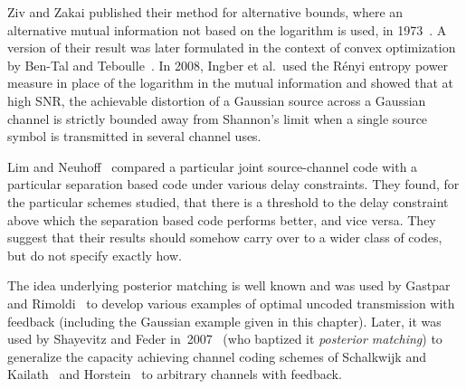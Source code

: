 Ziv and Zakai published their method for alternative bounds, where an
alternative mutual information not based on the logarithm is used, in
1973~\cite{ZivZ1973}. A version of their result was later formulated in the
context of convex optimization by Ben-Tal and Teboulle~\cite{BenTalT1988}. In
2008, Ingber et al.\ used the R\'enyi entropy power measure in place of the
logarithm in the mutual information and showed that at high SNR, the achievable
distortion of a Gaussian source across a Gaussian channel is strictly bounded
away from Shannon's limit when a single source symbol is transmitted in several
channel uses. 

Lim and Neuhoff~\cite{LimN2003} compared a particular joint source-channel code
with a particular separation based code under various delay constraints. They
found, for the particular schemes studied, that there is a threshold to the
delay constraint above which the separation based code performs better, and vice
versa. They suggest that their results should somehow carry over to a wider
class of codes, but do not specify exactly how. 

The idea underlying posterior matching is well known and was used by Gastpar and
Rimoldi~\cite{GastparR2003} to develop various examples of optimal uncoded
transmission with feedback (including the Gaussian example given in this
chapter). Later, it was used by Shayevitz and Feder
in~2007~\cite{ShayevitzF2007,ShayevitzF2008} (who baptized it \emph{posterior
matching}) to generalize the capacity achieving channel coding schemes of
Schalkwijk and Kailath~\cite{SchalkwijkK1966} and Horstein~\cite{Horstein1963}
to arbitrary channels with feedback.






